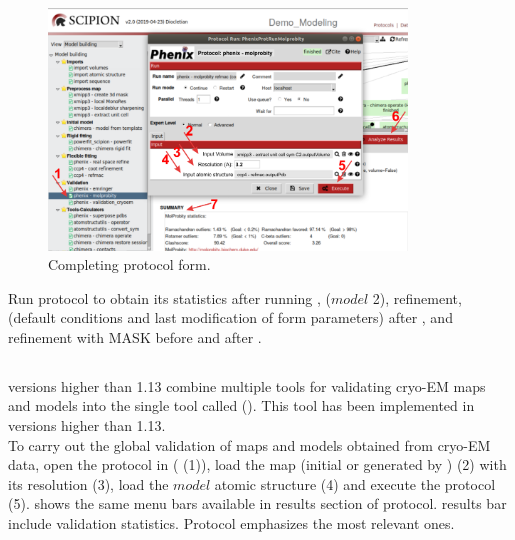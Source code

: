  \begin{figure}[H]
  \centering 
  \captionsetup{width=.7\linewidth} 
  \includegraphics[width=0.85\textwidth]{Images/Fig35}
  \caption{Completing \molprobity protocol form.}
  \label{fig:molprobity_protocol}
  \end{figure}
  
  Run \molprobity protocol to obtain its statistics after running , \chimera {} ($model$ 2), \coot refinement, \phenix {} (default conditions and last modification of form parameters) after \coot, and  refinement with MASK before and after \phenix {}. 
  
  \subsection*{\validationCryoEM}
  
  \phenix versions higher than 1.13 combine multiple tools for validating cryo-EM maps and models into the single tool called \validationCryoEM (\citep{afonine2018b}). This tool has been implemented in \phenix versions higher than 1.13.\\
  
  To carry out the global validation of maps and models obtained from cryo-EM data, open the protocol  in \scipion ( (1)), load the map (initial or generated by \coot) (2) with its resolution (3), load the $model$ atomic structure (4) and execute the protocol (5).  shows the same menu bars available in results section of \phenix {} protocol. \molprobity results bar include validation statistics. Protocol  emphasizes the most relevant ones.\\
  
